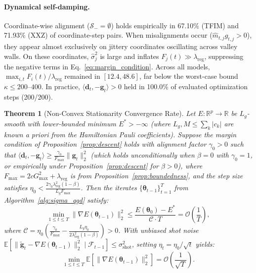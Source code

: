 \documentclass[11pt,a4paper]{article}
\newtheorem{theorem}{Theorem}
\begin{document}
\paragraph{Dynamical self-damping.}
Coordinate-wise alignment ($\mathcal{S}_- = \emptyset$) holds empirically in 67.10\% (TFIM) and 71.93\% (XXZ) of coordinate-step pairs. When misalignments occur ($\hat{m}_{t,j} g_{t,j} > 0$), they appear almost exclusively on jittery coordinates oscillating across valley walls. On these coordinates, $\hat{\sigma}_j^2$ is large and inflates $F_j(t) \gg \lambda_{\text{reg}}$, suppressing the negative terms in Eq.~\eqref{eq:margin_condition}. Across all models, $\max_{i,t} F_i(t)/\lambda_{\text{reg}}$ remained in $[12.4, 48.6]$, far below the worst-case bound $\kappa \le 200$--$400$. In practice, $\langle \mathbf{d}_t, -\mathbf{g}_t \rangle > 0$ held in 100.0\% of evaluated optimization steps (200/200).

\begin{theorem}[Non-Convex Stationarity Convergence Rate]
\label{thm:convergence}
Let $E: \mathbb{R}^p \to \mathbb{R}$ be $L_g$-smooth with lower-bounded minimum $E^* > -\infty$ (where $L_g, M \le \sum_k |c_k|$ are known a priori from the Hamiltonian Pauli coefficients). Suppose the margin condition of Proposition~\ref{prop:descent} holds with alignment factor $\gamma_0 > 0$ such that $\langle \mathbf{d}_t, -\mathbf{g}_t \rangle \ge \frac{\gamma_0}{F_{\max}} \|\mathbf{g}_t\|_2^2$ (which holds unconditionally when $\beta = 0$ with $\gamma_0 = 1$, or empirically under Proposition~\ref{prop:descent} for $\beta > 0$), where $F_{\max} = 2c G_{\max}^2 + \lambda_{\text{reg}}$ is from Proposition~\ref{prop:boundedness}, and the step size satisfies $\eta_0 < \frac{2\gamma_0 \lambda_{\text{reg}}^2 (1-\beta)}{L_g F_{\max}}$. Then the iterates $\{\boldsymbol{\theta}_{t-1}\}_{t=1}^T$ from Algorithm~\ref{alg:sigma_qgd} satisfy:
\begin{equation}
\min_{1 \le t \le T} \|\nabla E(\boldsymbol{\theta}_{t-1})\|_2^2 \le \frac{E(\boldsymbol{\theta}_0) - E^*}{\mathcal{C} \cdot T} = \mathcal{O}\left(\frac{1}{T}\right),
\label{eq:ergodic_rate}
\end{equation}
where $\mathcal{C} = \eta_0 \left( \frac{\gamma_0}{F_{\max}} - \frac{L_g \eta_0}{2 \lambda_{\text{reg}}^2 (1-\beta)} \right) > 0$. With unbiased shot noise $\mathbb{E}[\|\tilde{\mathbf{g}}_t - \nabla E(\boldsymbol{\theta}_{t-1})\|_2^2 \mid \mathcal{F}_{t-1}] \le \sigma_{\text{shot}}^2$, setting $\eta_t = \eta_0 / \sqrt{t}$ yields:
\begin{equation}
\min_{1 \le t \le T} \mathbb{E}\left[\|\nabla E(\boldsymbol{\theta}_{t-1})\|_2^2\right] = \mathcal{O}\left(\frac{1}{\sqrt{T}}\right).
\label{eq:stochastic_rate}
\end{equation}
\end{theorem}
\end{document}

